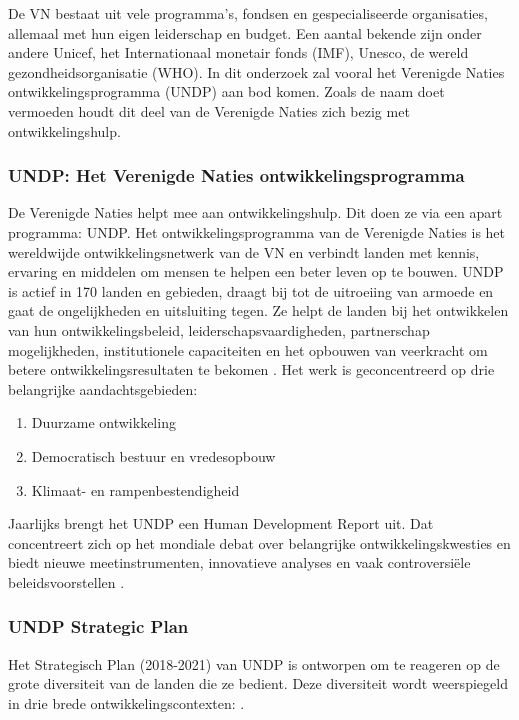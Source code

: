 De VN bestaat uit vele programma's, fondsen en gespecialiseerde organisaties, allemaal met hun eigen leiderschap en budget. Een aantal bekende zijn onder andere Unicef, het Internationaal monetair fonds (IMF), Unesco, de wereld gezondheidsorganisatie (WHO). In dit onderzoek zal vooral het Verenigde Naties ontwikkelingsprogramma (UNDP) aan bod komen. Zoals de naam doet vermoeden houdt dit deel van de Verenigde Naties zich bezig met ontwikkelingshulp.

\subsubsection{UNDP: Het Verenigde Naties ontwikkelingsprogramma}
De Verenigde Naties helpt mee aan ontwikkelingshulp. Dit doen ze via een apart programma: UNDP. Het ontwikkelingsprogramma van de Verenigde Naties is het wereldwijde ontwikkelingsnetwerk van de VN en verbindt landen met kennis, ervaring en middelen om mensen te helpen een beter leven op te bouwen. UNDP is actief in 170 landen en gebieden, draagt bij tot de uitroeiing van armoede en gaat de ongelijkheden en uitsluiting tegen. Ze helpt de landen bij het ontwikkelen van hun ontwikkelingsbeleid, leiderschapsvaardigheden, partnerschap mogelijkheden, institutionele capaciteiten en het opbouwen van veerkracht om betere ontwikkelingsresultaten te bekomen \autocite{DevelopmentProgram2020}.
Het werk is geconcentreerd op drie belangrijke aandachtsgebieden:

\begin{enumerate}
\item Duurzame ontwikkeling
\item Democratisch bestuur en vredesopbouw
\item Klimaat- en rampenbestendigheid
\end{enumerate}

 Jaarlijks brengt het UNDP een Human Development Report uit. Dat concentreert zich op het mondiale debat over belangrijke ontwikkelingskwesties en biedt nieuwe meetinstrumenten, innovatieve analyses en vaak controversiële beleidsvoorstellen \autocite{DevelopmentProgram2020}.

\subsubsection{UNDP Strategic Plan}
Het Strategisch Plan (2018-2021) van UNDP is ontworpen om te reageren op de grote diversiteit van de landen die ze bedient. Deze diversiteit wordt weerspiegeld in drie brede ontwikkelingscontexten: \autocite{DevelopmentProgram2020}.

